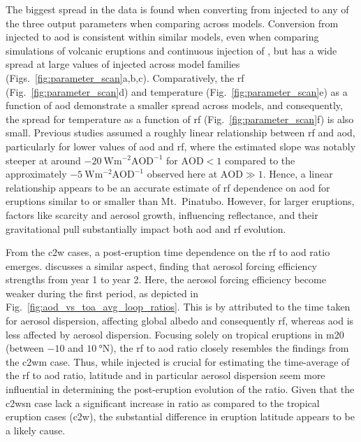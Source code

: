 \documentclass{ametsocV6.1}
\newcommand{\iso}[1][i]{{#1}njected \ce{SO2}}
\begin{document}
The biggest spread in the data is found when converting from \iso{} to any of the three
output parameters when comparing across models. Conversion from \iso{} to \gls{aod} is
consistent within similar models, even when comparing simulations of volcanic eruptions
\citep{timmreck2010} and continuous injection of  \citep{niemeier2015}, but has
a wide spread at large values of \iso{} across model families
(Figs.~\ref{fig:parameter_scan}a,b,c). Comparatively, the \gls{rf}
(Fig.~\ref{fig:parameter_scan}d) and temperature (Fig.~\ref{fig:parameter_scan}e) as a
function of \gls{aod} demonstrate a smaller spread across models, and consequently, the
spread for temperature as a function of \gls{rf} (Fig.~\ref{fig:parameter_scan}f) is
also small. Previous studies assumed a roughly linear relationship between \gls{rf} and
\gls{aod}, particularly for lower values of \gls{aod} and \gls{rf}, where the estimated
slope was notably steeper at around \(\SI{-20}{\watt\metre^{-2}\mathrm{AOD}^{-1}}\) for
\(\mathrm{AOD}<1\) compared to the approximately
\(\SI{-5}{\watt\metre^{-2}\mathrm{AOD}^{-1}}\) observed here at \(\mathrm{AOD}\gg1\).
Hence, a linear relationship appears to be an accurate estimate of \gls{rf} dependence
on \gls{aod} for eruptions similar to or smaller than Mt.\ Pinatubo. However, for larger
eruptions, factors like  scarcity and aerosol growth, influencing reflectance,
and their gravitational pull substantially impact both \gls{aod} and \gls{rf} evolution.

From the \gls{c2w} cases, a post-eruption time dependence on the \gls{rf} to \gls{aod}
ratio emerges. \citet{marshall2020} discusses a similar aspect, finding that aerosol
forcing efficiency strengths from year 1 to year 2. Here, the aerosol forcing efficiency
become weaker during the first period, as depicted in
Fig.~\ref{fig:aod_vs_toa_avg_loop_ratios}. This is by \citet{marshall2020} attributed to
the time taken for aerosol dispersion, affecting global albedo and consequently
\gls{rf}, whereas \gls{aod} is less affected by aerosol dispersion. Focusing solely on
tropical eruptions in \gls{m20} (between \(-10\) and \(\SI{10}{\degree\mathrm{N}}\)),
the \gls{rf} to \gls{aod} ratio closely resembles the findings from the \gls{c2wm} case.
Thus, while \iso{} is crucial for estimating the time-average of the \gls{rf} to
\gls{aod} ratio, latitude and in particular aerosol dispersion seem more influential in
determining the post-eruption evolution of the ratio. Given that the \gls{c2wsn} case
lack a significant increase in ratio as compared to the tropical eruption cases
(\gls{c2w}), the substantial difference in eruption latitude appears to be a likely
cause.
\end{document}
